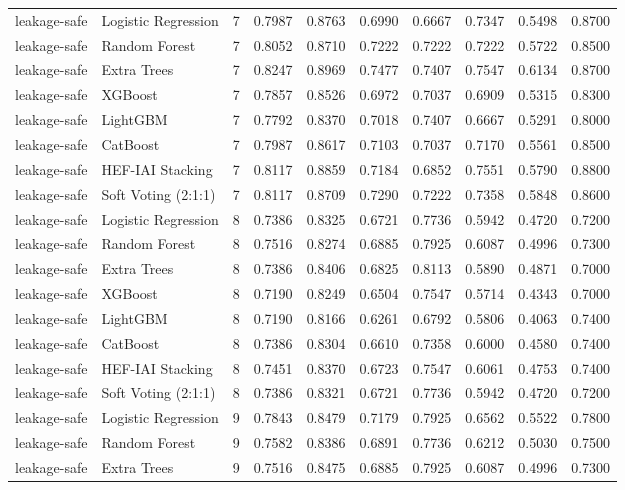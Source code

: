 \begin{tabular}{llrrrrrrrr}
leakage-safe & Logistic Regression & 7 & 0.7987 & 0.8763 & 0.6990 & 0.6667 & 0.7347 & 0.5498 & 0.8700 \\
leakage-safe & Random Forest & 7 & 0.8052 & 0.8710 & 0.7222 & 0.7222 & 0.7222 & 0.5722 & 0.8500 \\
leakage-safe & Extra Trees & 7 & 0.8247 & 0.8969 & 0.7477 & 0.7407 & 0.7547 & 0.6134 & 0.8700 \\
leakage-safe & XGBoost & 7 & 0.7857 & 0.8526 & 0.6972 & 0.7037 & 0.6909 & 0.5315 & 0.8300 \\
leakage-safe & LightGBM & 7 & 0.7792 & 0.8370 & 0.7018 & 0.7407 & 0.6667 & 0.5291 & 0.8000 \\
leakage-safe & CatBoost & 7 & 0.7987 & 0.8617 & 0.7103 & 0.7037 & 0.7170 & 0.5561 & 0.8500 \\
leakage-safe & HEF-IAI Stacking & 7 & 0.8117 & 0.8859 & 0.7184 & 0.6852 & 0.7551 & 0.5790 & 0.8800 \\
leakage-safe & Soft Voting (2:1:1) & 7 & 0.8117 & 0.8709 & 0.7290 & 0.7222 & 0.7358 & 0.5848 & 0.8600 \\
leakage-safe & Logistic Regression & 8 & 0.7386 & 0.8325 & 0.6721 & 0.7736 & 0.5942 & 0.4720 & 0.7200 \\
leakage-safe & Random Forest & 8 & 0.7516 & 0.8274 & 0.6885 & 0.7925 & 0.6087 & 0.4996 & 0.7300 \\
leakage-safe & Extra Trees & 8 & 0.7386 & 0.8406 & 0.6825 & 0.8113 & 0.5890 & 0.4871 & 0.7000 \\
leakage-safe & XGBoost & 8 & 0.7190 & 0.8249 & 0.6504 & 0.7547 & 0.5714 & 0.4343 & 0.7000 \\
leakage-safe & LightGBM & 8 & 0.7190 & 0.8166 & 0.6261 & 0.6792 & 0.5806 & 0.4063 & 0.7400 \\
leakage-safe & CatBoost & 8 & 0.7386 & 0.8304 & 0.6610 & 0.7358 & 0.6000 & 0.4580 & 0.7400 \\
leakage-safe & HEF-IAI Stacking & 8 & 0.7451 & 0.8370 & 0.6723 & 0.7547 & 0.6061 & 0.4753 & 0.7400 \\
leakage-safe & Soft Voting (2:1:1) & 8 & 0.7386 & 0.8321 & 0.6721 & 0.7736 & 0.5942 & 0.4720 & 0.7200 \\
leakage-safe & Logistic Regression & 9 & 0.7843 & 0.8479 & 0.7179 & 0.7925 & 0.6562 & 0.5522 & 0.7800 \\
leakage-safe & Random Forest & 9 & 0.7582 & 0.8386 & 0.6891 & 0.7736 & 0.6212 & 0.5030 & 0.7500 \\
leakage-safe & Extra Trees & 9 & 0.7516 & 0.8475 & 0.6885 & 0.7925 & 0.6087 & 0.4996 & 0.7300 \\

\end{tabular}
